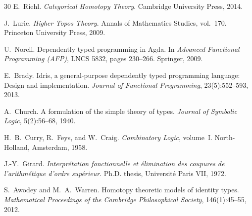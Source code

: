 \documentclass[11pt,a4paper]{article}
\theoremstyle{plain}
\theoremstyle{definition}
\theoremstyle{remark}
\begin{document}
\begin{thebibliography}{30}
E.~Riehl.
\newblock \emph{Categorical Homotopy Theory}.
\newblock Cambridge University Press, 2014.

J.~Lurie.
\newblock \emph{Higher Topos Theory}.
\newblock Annals of Mathematics Studies, vol.~170. Princeton University Press, 2009.

U.~Norell.
\newblock Dependently typed programming in Agda.
\newblock In \emph{Advanced Functional Programming (AFP)}, LNCS 5832, pages 230--266. Springer, 2009.

E.~Brady.
\newblock Idris, a general-purpose dependently typed programming language: Design and implementation.
\newblock \emph{Journal of Functional Programming}, 23(5):552--593, 2013.

A.~Church.
\newblock A formulation of the simple theory of types.
\newblock \emph{Journal of Symbolic Logic}, 5(2):56--68, 1940.

H.~B.~Curry, R.~Feys, and W.~Craig.
\newblock \emph{Combinatory Logic}, volume~I.
\newblock North-Holland, Amsterdam, 1958.

J.-Y.~Girard.
\newblock \emph{Interpr\'{e}tation fonctionnelle et \'{e}limination des coupures de l'arithm\'{e}tique d'ordre sup\'{e}rieur}.
\newblock Ph.D. thesis, Universit\'{e} Paris VII, 1972.

S.~Awodey and M.~A.~Warren.
\newblock Homotopy theoretic models of identity types.
\newblock \emph{Mathematical Proceedings of the Cambridge Philosophical Society}, 146(1):45--55, 2012.

\end{thebibliography}
\end{document}
